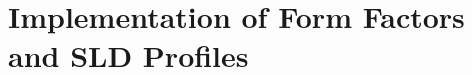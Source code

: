 \documentclass[\main/dresen_thesis.tex]{subfiles}
\renewcommand{\thisPath}{\main/chapters/appendix/code}
\begin{document}
\chapter{Implementation of Form Factors and SLD Profiles}\label{sec:appendix:code}

\cleardoublepage

\cleardoublepage
\end{document}
